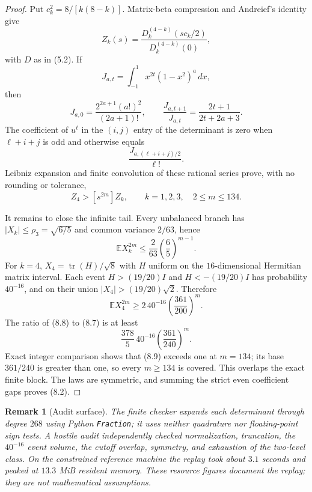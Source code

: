 \documentclass[11pt]{article}
\newtheorem{remark}[theorem]{Remark}
\newcommand{\E}{\mathbb E}
\newcommand{\tr}{\operatorname{tr}}
\begin{document}
\begin{proof}
Put $c_k^2=8/[k(8-k)]$.  Matrix-beta compression and Andreief's identity give
\begin{equation}
 Z_k(s)=\frac{D_k^{(4-k)}(sc_k/2)}{D_k^{(4-k)}(0)},          \tag{8.3}
\end{equation}
with $D$ as in (5.2).  If
\[
 J_{a,t}=\int_{-1}^{1}x^{2t}(1-x^2)^a\,dx,
\]
then
\begin{equation}
 J_{a,0}=\frac{2^{2a+1}(a!)^2}{(2a+1)!},\qquad
 \frac{J_{a,t+1}}{J_{a,t}}=\frac{2t+1}{2t+2a+3}.           \tag{8.4}
\end{equation}
The coefficient of $u^\ell$ in the $(i,j)$ entry of the determinant is zero
when $\ell+i+j$ is odd and otherwise equals
\begin{equation}
 \frac{J_{a,(\ell+i+j)/2}}{\ell!}.                         \tag{8.5}
\end{equation}
Leibniz expansion and finite convolution of these rational series prove,
with no rounding or tolerance,
\begin{equation}
 [s^{2m}]Z_4>[s^{2m}]Z_k,\qquad
 k=1,2,3,\quad 2\le m\le134.                              \tag{8.6}
\end{equation}

It remains to close the infinite tail.  Every unbalanced branch has
$|X_k|\le\rho_3=\sqrt{6/5}$ and common variance $2/63$, hence
\begin{equation}
 \E X_k^{2m}\le\frac2{63}\left(\frac65\right)^{m-1}.      \tag{8.7}
\end{equation}
For $k=4$, $X_4=\tr(H)/\sqrt8$ with $H$ uniform on the
$16$-dimensional Hermitian matrix interval.  Each event
$H>(19/20)I$ and $H<-(19/20)I$ has probability $40^{-16}$, and on their
union $|X_4|>(19/20)\sqrt2$.  Therefore
\begin{equation}
 \E X_4^{2m}\ge2\,40^{-16}\left(\frac{361}{200}\right)^m.\tag{8.8}
\end{equation}
The ratio of (8.8) to (8.7) is at least
\begin{equation}
 \frac{378}{5}\,40^{-16}\left(\frac{361}{240}\right)^m. \tag{8.9}
\end{equation}
Exact integer comparison shows that (8.9) exceeds one at $m=134$; its base
$361/240$ is greater than one, so every $m\ge134$ is covered.  This overlaps
the exact finite block.  The laws are symmetric, and summing the strict even
coefficient gaps proves (8.2).
\end{proof}

\begin{remark}[Audit surface]
The finite checker expands each determinant through degree $268$ using
Python \texttt{Fraction}; it uses neither quadrature nor floating-point sign
tests.  A hostile audit independently checked normalization, truncation,
the $40^{-16}$ event volume, the cutoff overlap, symmetry, and exhaustion of
the two-level class.  On the constrained reference machine the replay took
about $3.1$ seconds and peaked at $13.3$ MiB resident memory.  These resource
figures document the replay; they are not mathematical assumptions.
\end{remark}
\end{document}

